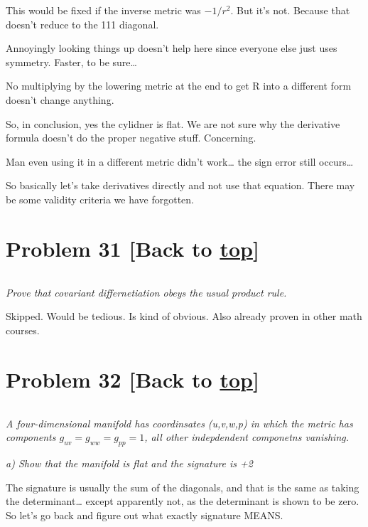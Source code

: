 \documentclass[landscape,letterpaper,10pt,english]{article}
\begin{document}
This would be fixed if the inverse metric was \(-1/r^2\). But it's not.
Because that doesn't reduce to the 111 diagonal.

Annoyingly looking things up doesn't help here since everyone else just
uses symmetry. Faster, to be sure\ldots{}

No multiplying by the lowering metric at the end to get R into a
different form doesn't change anything.

So, in conclusion, yes the cylidner is flat. We are not sure why the
derivative formula doesn't do the proper negative stuff. Concerning.

Man even using it in a different metric didn't work\ldots{} the sign
error still occurs\ldots{}

So basically let's take derivatives directly and not use that equation.
There may be some validity criteria we have forgotten.

    \hypertarget{problem-31-back-to-top}{%
\section{\texorpdfstring{Problem 31 {[}Back to
\hyperref[toc]{top}{]}}{Problem 31 {[}Back to {]}}}\label{problem-31-back-to-top}}

\[\label{P31}\]

\emph{Prove that covariant differnetiation obeys the usual product
rule.}

Skipped. Would be tedious. Is kind of obvious. Also already proven in
other math courses.

    \hypertarget{problem-32-back-to-top}{%
\section{\texorpdfstring{Problem 32 {[}Back to
\hyperref[toc]{top}{]}}{Problem 32 {[}Back to {]}}}\label{problem-32-back-to-top}}

\[\label{P32}\]

\emph{A four-dimensional manifold has coordinsates (u,v,w,p) in which
the metric has components \(g_{uv}=g_{ww}=g_{pp}=1\), all other
indepdendent componetns vanishing.}

\emph{a) Show that the manifold is flat and the signature is +2}

The signature is usually the sum of the diagonals, and that is the same
as taking the determinant\ldots{} except apparently not, as the
determinant is shown to be zero. So let's go back and figure out what
exactly signature MEANS.
\end{document}
